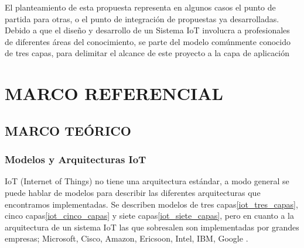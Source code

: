 \documentclass[stu,12pt,floatsintext]{apa7}
\begin{document}
	El planteamiento de esta propuesta representa en algunos casos el punto de partida para otras, o el punto de integración de propuestas ya desarrolladas.
	Debido a que el diseño y desarrollo de un Sistema IoT involucra a profesionales de diferentes áreas del conocimiento, se parte del modelo comúnmente conocido de tres capas, para delimitar el alcance de este proyecto a la capa de aplicación
	
	\section{MARCO REFERENCIAL}
	\subsection{MARCO TEÓRICO}
	\subsubsection{Modelos  y Arquitecturas IoT}
	IoT (Internet of Things) no tiene una arquitectura estándar, a modo general se puede hablar de modelos para describir las diferentes arquitecturas que encontramos implementadas. Se describen modelos de tres capas\ref{iot_tres_capas}, cinco capas\ref{iot_cinco_capas} y siete capas\ref{iot_siete_capas}, pero en cuanto a la arquitectura de un sistema IoT las que sobresalen son implementadas por grandes empresas; Microsoft, Cisco, Amazon, Ericsoon, Intel, IBM, Google \cite{DBLP:journals/corr/abs-2004-12936}.
	
\end{document}
